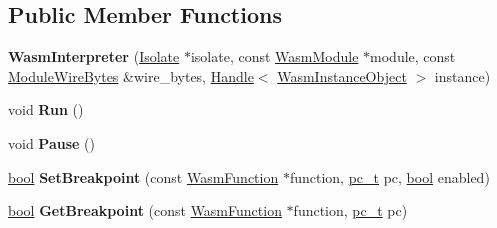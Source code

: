 \subsection*{Public Member Functions}
\begin{DoxyCompactItemize}
\item 
\mbox{\label{classv8_1_1internal_1_1wasm_1_1WasmInterpreter_adbef8a2505ba8a4e3943679c00688486}} 
{\bfseries Wasm\+Interpreter} (\mbox{\hyperlink{classv8_1_1internal_1_1Isolate}{Isolate}} $\ast$isolate, const \mbox{\hyperlink{structv8_1_1internal_1_1wasm_1_1WasmModule}{Wasm\+Module}} $\ast$module, const \mbox{\hyperlink{structv8_1_1internal_1_1wasm_1_1ModuleWireBytes}{Module\+Wire\+Bytes}} \&wire\+\_\+bytes, \mbox{\hyperlink{classv8_1_1internal_1_1Handle}{Handle}}$<$ \mbox{\hyperlink{classv8_1_1internal_1_1WasmInstanceObject}{Wasm\+Instance\+Object}} $>$ instance)
\item 
\mbox{\label{classv8_1_1internal_1_1wasm_1_1WasmInterpreter_a8c21ea0823c606ceb8679c627739f06e}} 
void {\bfseries Run} ()
\item 
\mbox{\label{classv8_1_1internal_1_1wasm_1_1WasmInterpreter_ac0e46b69b536edfb2ad798e044c23d31}} 
void {\bfseries Pause} ()
\item 
\mbox{\label{classv8_1_1internal_1_1wasm_1_1WasmInterpreter_a5a76092285a19cebd60c0f384617f8f7}} 
\mbox{\hyperlink{classbool}{bool}} {\bfseries Set\+Breakpoint} (const \mbox{\hyperlink{structv8_1_1internal_1_1wasm_1_1WasmFunction}{Wasm\+Function}} $\ast$function, \mbox{\hyperlink{classsize__t}{pc\+\_\+t}} pc, \mbox{\hyperlink{classbool}{bool}} enabled)
\item 
\mbox{\label{classv8_1_1internal_1_1wasm_1_1WasmInterpreter_a64a21df63044a1d7bbb48ec2275e83c8}} 
\mbox{\hyperlink{classbool}{bool}} {\bfseries Get\+Breakpoint} (const \mbox{\hyperlink{structv8_1_1internal_1_1wasm_1_1WasmFunction}{Wasm\+Function}} $\ast$function, \mbox{\hyperlink{classsize__t}{pc\+\_\+t}} pc)
\item 
\mbox{\label{classv8_1_1internal_1_1wasm_1_1WasmInterpreter_acd5766f06b240a8e6e8d3639ed74946f}} 

\end{DoxyCompactItemize}
